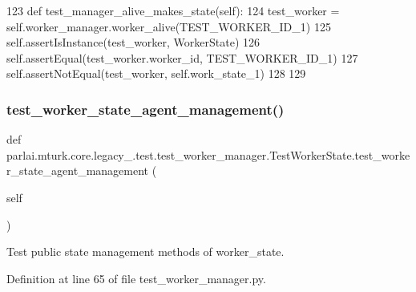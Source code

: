 \begin{DoxyCode}
123     \textcolor{keyword}{def }test\_manager\_alive\_makes\_state(self):
124         test\_worker = self.worker\_manager.worker\_alive(TEST\_WORKER\_ID\_1)
125         self.assertIsInstance(test\_worker, WorkerState)
126         self.assertEqual(test\_worker.worker\_id, TEST\_WORKER\_ID\_1)
127         self.assertNotEqual(test\_worker, self.work\_state\_1)
128 
129 
\end{DoxyCode}
\mbox{\label{classparlai_1_1mturk_1_1core_1_1legacy__2018_1_1test_1_1test__worker__manager_1_1TestWorkerState_ac4b51d4f64e945c55c8029a444489619}} 
\subsubsection{\texorpdfstring{test\+\_\+worker\+\_\+state\+\_\+agent\+\_\+management()}{test\_worker\_state\_agent\_management()}}
{\footnotesize\ttfamily def parlai.\+mturk.\+core.\+legacy\+\_.\+test.\+test\+\_\+worker\+\_\+manager.\+Test\+Worker\+State.\+test\+\_\+worker\+\_\+state\+\_\+agent\+\_\+management (\begin{DoxyParamCaption}\item[{}]{self }\end{DoxyParamCaption})}

\begin{DoxyVerb}Test public state management methods of worker_state.
\end{DoxyVerb}
 

Definition at line 65 of file test\+\_\+worker\+\_\+manager.\+py.


